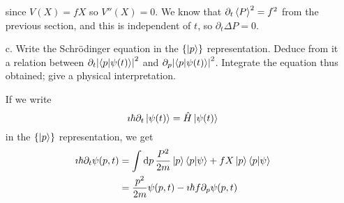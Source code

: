 \documentclass[a4paper,twoside]{article}
\begin{document}
\begin{itemize}
\begin{equation}
        \end{equation}
        since $ V(X) = fX $ so $ V''(X) = 0 $. We know that $ \partial_t\expval{P}^2 = f^2 $ from the previous section, and this is independent of $ t $, so $ \partial_t \Delta P = 0 $.
    \item[c.] Write the Schr\"odinger equation in the $ \{\ket{p}\} $ representation. Deduce from it a relation between $ \partial_t \abs{\bra{p}\ket{\psi(t)}}^2 $ and $ \partial_p \abs{\bra{p}\ket{\psi(t)}}^2 $. Integrate the equation thus obtained; give a physical interpretation.
        \begin{problem}
            If we write
            \begin{equation}
                \imath\hbar\partial_t \ket{\psi(t)} = \hat{H} \ket{\psi(t)} 
            \end{equation}
            in the $ \{\ket{p}\} $ representation, we get
            \begin{align}
                \imath\hbar\partial_t \psi(p, t) &= \int \dd{p} \frac{P^2}{2m} \ket{p} \bra{p}\ket{\psi} + f X \ket{p}\bra{p}\ket{\psi}\\
                &= \frac{p^2}{2m} \psi(p, t) - \imath\hbar f \partial_p \psi(p, t)
            \end{align}
        \end{problem}
\end{itemize}
\end{document}
